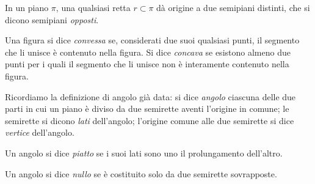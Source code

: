 \begin{inaccessibleblock}
 \begin{center}\end{center}
\end{inaccessibleblock}
In un piano \({\pi}\), una qualsiasi retta \(r \subset \pi\) dà origine a 
due semipiani distinti, che si dicono semipiani \emph{opposti}.


\begin{definizione}
Una figura si dice \emph{convessa} se, considerati due suoi qualsiasi 
punti, il segmento che li unisce è contenuto nella figura. Si dice 
\emph{concava} se esistono almeno due punti per i quali il segmento 
che li unisce non è interamente contenuto nella figura. 
\end{definizione}

\begin{inaccessibleblock}
 \begin{center} \end{center}
\end{inaccessibleblock}

Ricordiamo la definizione di angolo già data: si dice \emph{angolo} 
ciascuna delle due parti in cui un piano è diviso da due semirette 
aventi l'origine in comune; le semirette si dicono \emph{lati} 
dell'angolo; l'origine comune alle due semirette si dice 
\emph{vertice} dell'angolo.%

\begin{definizione}
Un angolo si dice \emph{piatto} se i suoi lati sono uno il 
prolungamento dell'altro.
\end{definizione}

\begin{definizione}
Un angolo si dice \emph{nullo} se è costituito solo da due semirette 
sovrapposte.
\end{definizione}

